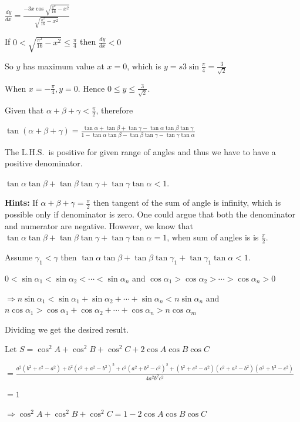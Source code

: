   $\frac{dy}{dx} = \frac{-3x\cos\sqrt{\frac{\pi^2}{16} - x^2}}{\sqrt{\frac{\pi^2}{16} - x^2}}$

  If $0 < \sqrt{\frac{\pi^2}{16} - x^2}\leq \frac{\pi}{4}$ then $\frac{dy}{dx} < 0$

  So $y$ has maximum value at $x = 0$, which is $y = s3\sin\frac{\pi}{4} = \frac{3}{\sqrt{2}}$

  When $x = -\frac{\pi}{4}, y = 0$. Hence $0\leq y\leq\frac{3}{\sqrt{2}}$.
\item Given that $\alpha + \beta + \gamma < \frac{\pi}{2}$, therefore

  $\tan(\alpha + \beta + \gamma) = \frac{\tan\alpha + \tan\beta + \tan\gamma -
  \tan\alpha\tan\beta\tan\gamma}{1 - \tan\alpha\tan\beta - \tan\beta\tan\gamma - \tan\gamma\tan\alpha}$

  The L.H.S.\ is positive for given range of angles and thus we have to have a positive denominator.

  $\tan\alpha\tan\beta + \tan\beta\tan\gamma + \tan\gamma\tan\alpha < 1$.

  {\bf Hints:} If $\alpha + \beta + \gamma = \frac{\pi}{2}$ then tangent of the sum of angle is infinity,
  which is possible only if denominator is zero. One could argue that both the denominator and numerator are
  negative. However, we know that $\tan\alpha\tan\beta + \tan\beta\tan\gamma + \tan\gamma\tan\alpha = 1$,
  when sum of angles is is $\frac{\pi}{2}$.

  Assume $\gamma_1 < \gamma$ then $\tan\alpha\tan\beta + \tan\beta\tan\gamma_1 + \tan\gamma_1\tan\alpha < 1$.
\item $0 < \sin\alpha _1 < \sin\alpha_2 < \cdots < \sin\alpha_n$ and $\cos\alpha_1 > \cos\alpha_2 >
  \cdots > \cos\alpha_n > 0$

  $\Rightarrow n\sin\alpha_1 < \sin\alpha_1 + \sin\alpha_2 + \cdots + \sin\alpha_n < n\sin\alpha_n$ and
  $n\cos\alpha_1 > \cos\alpha_1 + \cos\alpha_2 + \cdots + \cos\alpha_n > n\cos\alpha_m$

  Dividing we get the desired result.
\item Let $S = \cos^2A + \cos^2B + \cos^2C + 2\cos A\cos B\cos C$

  $= \frac{a^2(b^2 + c^2 - a^2) + b^2(c^2 + a^2 - b^2)^2 + c^2(a^2 + b^2 - c^2)^2 + (b^2 + c^2 - a^2)(c^2 +
  a^2 - b^2)(a^2 + b^2 - c^2)}{4a^2b^2c^2}$

  $= 1$

  $\Rightarrow \cos^2A + \cos^2 B + \cos^2C = 1 - 2\cos A\cos B\cos C$

